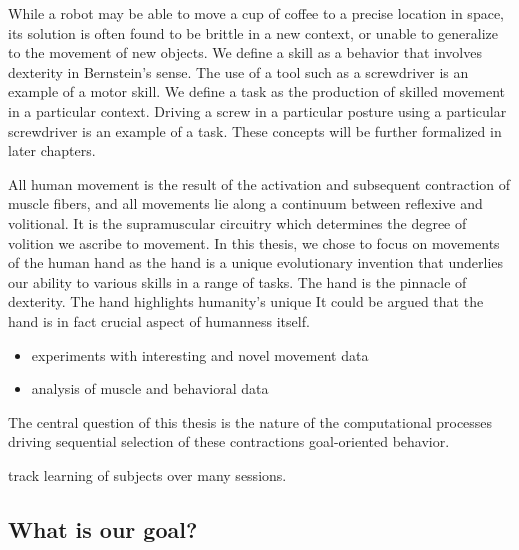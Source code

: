 {            While a robot may be able to move a cup of coffee to a
            precise location in space, its solution is often found to be
            brittle in a new context, or unable to generalize to the
            movement of new objects. We define a skill as a behavior
            that involves dexterity in Bernstein's sense. The use of a
            tool such as a screwdriver is an example of a motor skill.
            We define a task as the production of skilled movement in a
            particular context. Driving a screw in a particular posture
            using a particular screwdriver is an example of a task.
            These concepts will be further formalized in later chapters.

            All human movement is the result of the activation and
            subsequent contraction of muscle fibers, and all movements
            lie along a continuum between reflexive and volitional. It
            is the supramuscular circuitry which determines the degree
            of volition we ascribe to movement. In this thesis, we chose
            to focus on movements of the human hand as the hand is a
            unique evolutionary invention that underlies our ability to
            various skills in a range of tasks. The hand is the pinnacle
            of dexterity. The hand highlights humanity's unique It could
            be argued that the hand is in fact crucial aspect of
            humanness itself.

            \begin{itemize}
            \tightlist
            \item
              experiments with interesting and novel movement data
            \item
              analysis of muscle and behavioral data
            \end{itemize}

            The central question of this thesis is the nature of the
            computational processes driving sequential selection of
            these contractions goal-oriented behavior.

            track learning of subjects over many sessions.

            \hypertarget{what-is-our-goal}{%
            \subsection{What is our goal?}\label{what-is-our-goal}}

}
